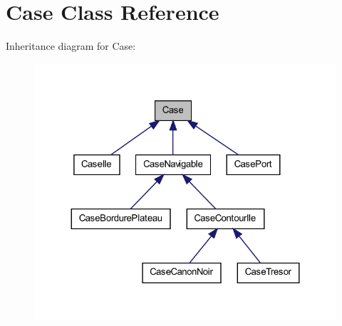 \hypertarget{class_case}{
\section{Case Class Reference}
\label{class_case}
}


Inheritance diagram for Case:
\nopagebreak
\begin{figure}[H]
\begin{center}
\leavevmode
\includegraphics[width=324pt]{class_case__inherit__graph}
\end{center}
\end{figure}
